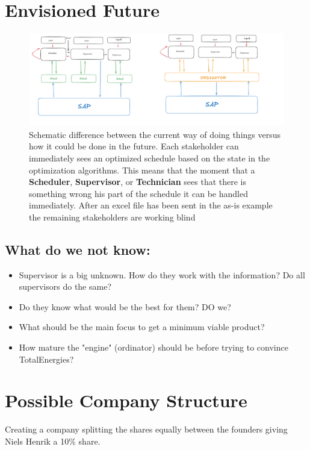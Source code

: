 \documentclass{article}
\begin{document}
\section{Envisioned Future}

\begin{figure}[H]
    \includegraphics[width=1.0\textwidth]{../../project-plans/scipo-total/figures/scheduling-as-is-to-be.png}
    \caption{Schematic difference between the current way of doing things versus how it could be done in the
    future. Each stakeholder can immediately sees an optimized schedule based on the state in the optimization
    algorithms. This means that the moment that a \textbf{Scheduler}, \textbf{Supervisor}, or \textbf{Technician}
    sees that there is something wrong his part of the schedule it can be handled immediately. After an excel file
    has been sent in the as-is example the remaining stakeholders are working blind}
\end{figure}

\subsection{What do we not know:}
\begin{itemize}
    \item Supervisor is a big unknown. How do they work with the information? Do all supervisors do the same?
    \item Do they know what would be the best for them? DO we?
    \item What should be the main focus to get a minimum viable product?
    \item How mature the "engine" (ordinator) should be before trying to convince TotalEnergies?
\end{itemize}


\section{Possible Company Structure}
Creating a company splitting the shares equally between the founders giving Niels Henrik a 10\% share. 
\end{document}
